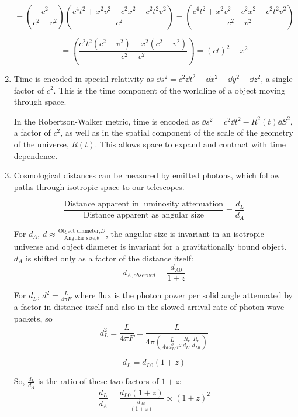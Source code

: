 \documentclass{paper}
\begin{document}
\begin{enumerate}
      \[ = \left(\frac{c^2}{c^2-v^2}\right)
      \left(\frac{c^4t^2 + x^2v^2 - c^2x^2 - c^2t^2v^2}{c^2}\right)
      = \left(\frac{c^4t^2 + x^2v^2 - c^2x^2 - c^2t^2v^2}{c^2 - v^2}\right)
      \]

      \[ = \left(\frac{c^2t^2(c^2 - v^2) - x^2(c^2 - v^2)}{c^2 - v^2}\right)
      = (ct)^2 - x^2 
      \]

    \item %
      Time is encoded in special relativity as
      \(\dd{s}^2 = c^2\dd{t}^2 - \dd{x}^2 - \dd{y}^2 - \dd{z}^2\), a single 
      factor of \(c^2\).  This is the time component of the worldline of a 
      object moving through space.

      In the Robertson-Walker metric, time is encoded as
      \(\dd{s}^2 = c^2\dd{t}^2 - R^2(t)\dd{S}^2\), a factor of \(c^2\), as 
      well as in the spatial component of the scale of the geometry of the 
      universe, \(R(t)\). This allows space to expand and contract with time
      dependence.

    \item %
      Cosmological distances can be measured by emitted photons, which follow 
      paths through isotropic space to our telescopes.

      \begin{equation}
        \frac{\textrm{Distance apparent in luminosity attenuation}}
        {\textrm{Distance apparent as angular size}}
        = \frac{d_L}{d_A}
      \end{equation}
      
      For \(d_A\), \(d \approx \frac{\textrm{Object diameter,} D}
      {\textrm{Angular size,} \theta}\), the angular size is invariant in an 
      isotropic universe and object diameter is invariant for a 
      gravitationally bound object. \(d_A\) is shifted only as a factor of the 
      distance itself:
      \[ d_{A, observed} = \frac{d_{A0}}{1 + z} \]

      For \(d_L\), \(d^2 = \frac{L}{4 \pi F}\) where flux is the photon power
      per solid angle attenuated by a factor in distance itself and also in 
      the slowed arrival rate of photon wave packets, so
      \[ d_L^2 = \frac{L}{4 \pi F} = 
      \frac{L}{4 \pi (\frac{L}{4 \pi d_{L0}^2 r^2} 
      \frac{R_e}{d_{L0}} \frac{R_e}{d_{L0}} ) } \]

      \[ d_L = d_{L0}(1 + z) \]

      So, \(\frac{d_L}{d_A}\) is the ratio of these two factors of \(1 + z\):
      \[ \frac{d_L}{d_A} = \frac{d_{L0}(1 + z)}{\frac{d_{A0}}{(1+z)}} 
      \propto (1 + z)^{2}\]


\end{enumerate}
\end{document}
